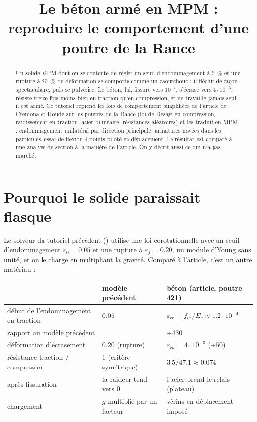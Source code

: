 \documentclass[11pt,a4paper]{article}
\title{Le béton armé en MPM :\\ reproduire le comportement d'une poutre de la Rance}
\author{}
\date{}
\newcommand{\code}[1]{\texttt{\detokenize{#1}}}
\begin{document}
\maketitle

\begin{abstract}
\noindent Un solide MPM dont on se contente de régler un seuil d'endommagement à 5~\% et une rupture
à 20~\% de déformation se comporte comme un caoutchouc : il fléchit de façon spectaculaire, puis
se pulvérise. Le béton, lui, fissure vers $10^{-4}$, s'écrase vers $4\cdot10^{-3}$, résiste
treize fois moins bien en traction qu'en compression, et ne travaille jamais seul : il est armé. Ce
tutoriel reprend les lois de comportement simplifiées de l'article de Cremona et Houde sur les
poutres de la Rance (loi de Desayi en compression, raidissement en traction, acier bilinéaire,
résistances aléatoires) et les traduit en MPM : endommagement unilatéral par direction principale,
armatures noyées dans les particules, essai de flexion 4 points piloté en déplacement. Le résultat
est comparé à une analyse de section à la manière de l'article. On y décrit aussi ce qui n'a pas
marché.
\end{abstract}

\tableofcontents
\bigskip

\section{Pourquoi le solide paraissait flasque}

Le solveur du tutoriel précédent (\code{tuto_mpm_solide}) utilise une loi corotationnelle avec un
seuil d'endommagement $\varepsilon_0 = 0.05$ et une rupture à $\varepsilon_f = 0.20$, un module
d'Young sans unité, et on le charge en multipliant la gravité. Comparé à l'article, c'est un autre
matériau :

\begin{center}
\begin{tabular}{@{}lll@{}}
\toprule
 & modèle précédent & béton (article, poutre 421) \\
\midrule
début de l'endommagement en traction & $0.05$ & $\varepsilon_{cr} = f_{cr}/E_c \approx 1.2\cdot10^{-4}$ \\
rapport au modèle précédent & & $\div 430$ \\
déformation d'écrasement & $0.20$ (rupture) & $\varepsilon_{cu} = 4\cdot10^{-3}$ ($\div 50$) \\
résistance traction / compression & $1$ (critère symétrique) & $3.5/47.1 \approx 0.074$ \\
après fissuration & la raideur tend vers 0 & l'acier prend le relais (plateau) \\
chargement & $g$ multiplié par un facteur & vérins en déplacement imposé \\
\bottomrule
\end{tabular}
\end{center}
\end{document}
